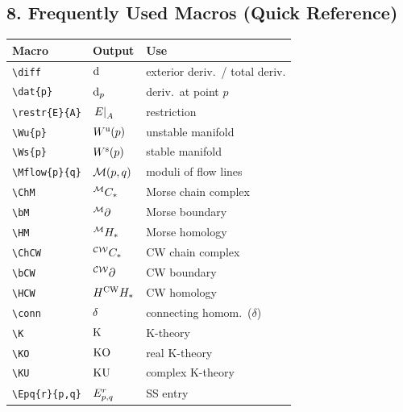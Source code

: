 \subsection*{8. Frequently Used Macros (Quick Reference)}

\begin{longtable}{@{} p{4cm} p{5cm} p{5cm} @{}}
	\toprule
	\textbf{Macro} & \textbf{Output} & \textbf{Use} \\
	\midrule
	\endhead
	
	\texttt{\textbackslash diff}        & $\mathop{}\!\mathrm{d}$           & exterior deriv.\ / total deriv. \\
	\texttt{\textbackslash dat\{p\}}    & $\mathop{}\!\mathrm{d}_{p}$         & deriv.\ at point $p$ \\
	\texttt{\textbackslash restr\{E\}\{A\}} & $\left.E\right|_{A}$ & restriction \\
	\texttt{\textbackslash Wu\{p\}}     & $W^{\mathrm{u}}(p)$          & unstable manifold \\
	\texttt{\textbackslash Ws\{p\}}     & $W^{\mathrm{s}}(p)$          & stable manifold \\
	\texttt{\textbackslash Mflow\{p\}\{q\}} & $\mathcal{M}(p,q)$ & moduli of flow lines \\
	\texttt{\textbackslash ChM}         & ${}^{\mathcal{M}}C_*$          & Morse chain complex \\
	\texttt{\textbackslash bM}          & ${}^{\mathcal{M}}\partial$             & Morse boundary \\
	\texttt{\textbackslash HM}          & ${}^{\mathcal{M}}H_*$           & Morse homology \\
	\texttt{\textbackslash ChCW}        & ${}^{\mathcal{CW}}C_*$         & CW chain complex \\
	\texttt{\textbackslash bCW}         & ${}^{\mathcal{CW}}\partial$            & CW boundary \\
	\texttt{\textbackslash HCW}         & $H^{\mathrm{CW}}H_*$          & CW homology \\
	\texttt{\textbackslash conn}        & $\delta$           & connecting homom.\ ($\delta$) \\
	\texttt{\textbackslash K}           & $\operatorname{\mathrm{K}}$              & K-theory \\
	\texttt{\textbackslash KO}          & $\mathrm{KO}$             & real K-theory \\
	\texttt{\textbackslash KU}          & $\mathrm{KU}$             & complex K-theory \\
	\texttt{\textbackslash Epq\{r\}\{p,q\}} & $E^{r}_{p,q}$ & SS entry \\

\end{longtable}
